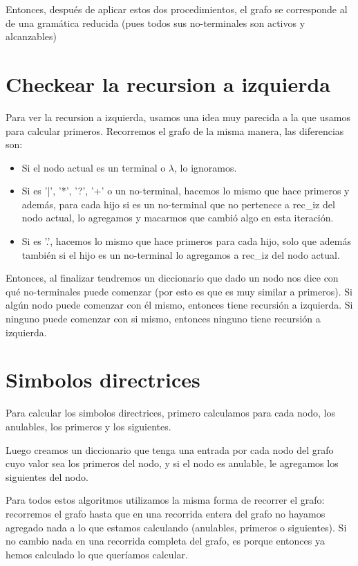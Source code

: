 \documentclass[a4paper]{report}
\begin{document}
	Entonces, después de aplicar estos dos procedimientos, el grafo se
corresponde al de una gramática reducida (pues todos sus no-terminales son
activos y alcanzables)


\section*{Checkear la recursion a izquierda}

	Para ver la recursion a izquierda, usamos una idea muy parecida a la que
usamos para calcular primeros. Recorremos el grafo de la misma manera, las
diferencias son:


\begin{itemize}

\item Si el nodo actual es un terminal o $\lambda$, lo ignoramos.

\item Si es '|', '*', '?', '+' o un no-terminal, hacemos lo mismo que hace primeros y además, para cada hijo si es un no-terminal que no pertenece a rec\_iz del nodo actual, lo agregamos y macarmos que cambió algo en
esta iteración.

\item Si es '.', hacemos lo mismo que hace primeros para cada hijo, solo que además también si el hijo es un no-terminal lo agregamos a rec\_iz del
nodo actual.

\end{itemize}


	Entonces, al finalizar tendremos un diccionario que dado un nodo nos
dice con qué no-terminales puede comenzar (por esto es que es muy similar a
primeros). Si algún nodo puede comenzar con él mismo, entonces tiene recursión a
izquierda. Si ninguno puede comenzar con si mismo, entonces ninguno tiene
recursión a izquierda.


\section*{Simbolos directrices}

Para calcular los simbolos directrices, primero calculamos para cada nodo, los
anulables, los primeros y los siguientes.


Luego creamos un diccionario que tenga una entrada por cada nodo del grafo cuyo
valor sea los primeros del nodo, y si el nodo es anulable, le agregamos los
siguientes del nodo.


Para todos estos algoritmos utilizamos la misma forma de recorrer el grafo:
recorremos el grafo hasta que en una recorrida entera del grafo no hayamos
agregado nada a lo que estamos calculando (anulables, primeros o siguientes). Si
no cambio nada en una recorrida completa del grafo, es porque entonces ya hemos
calculado lo que queríamos calcular.
\end{document}
